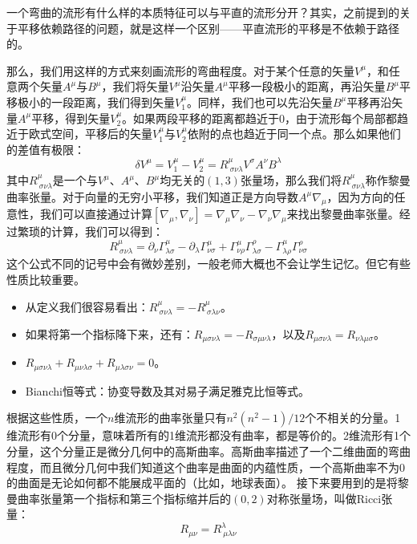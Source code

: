 \documentclass{ctexart}
\begin{document}
一个弯曲的流形有什么样的本质特征可以与平直的流形分开？其实，之前提到的关于平移依赖路径的问题，就是这样一个区别——平直流形的平移是不依赖于路径的。

那么，我们用这样的方式来刻画流形的弯曲程度。对于某个任意的矢量$V^\mu$，和任意两个矢量$A^\mu$与$B^\mu$，我们将矢量$V^\mu$沿矢量$A^\mu$平移一段极小的距离，再沿矢量$B^\mu$平移极小的一段距离，我们得到矢量$V_1^\mu$。同样，我们也可以先沿矢量$B^\mu$平移再沿矢量$A^\mu$平移，得到矢量$V_2^\mu$。如果两段平移的距离都趋近于0，由于流形每个局部都趋近于欧式空间，平移后的矢量$V_1^\mu$与$V_2^\mu$依附的点也趋近于同一个点。那么如果他们的差值有极限：
\begin{equation}
\delta V^\mu=V_1^\mu-V_2^\mu=R_{\ \sigma\nu\lambda}^{\mu}V^\sigma A^\nu B^\lambda
\end{equation}
其中$R_{\ \sigma\nu\lambda}^{\mu}$是一个与$V^\mu$、$A^\mu$、$B^\mu$均无关的$(1,3)$张量场，那么我们将$R_{\ \sigma\nu\lambda}^{\mu}$称作黎曼曲率张量。对于向量的无穷小平移，我们知道正是方向导数$A^\mu\nabla_\mu$，因为方向的任意性，我们可以直接通过计算$[\nabla_\mu,\nabla_\nu]=\nabla_\mu\nabla_\nu-\nabla_\nu\nabla_\mu$来找出黎曼曲率张量。经过繁琐的计算，我们可以得到：
\begin{equation}
R^\mu_{\ \sigma\nu\lambda}=\partial_\nu\Gamma^\mu_{\lambda\sigma}-\partial_\lambda\Gamma^\mu_{\nu\sigma}+\Gamma^\mu_{\nu\rho}\Gamma^\rho_{\lambda\sigma}-\Gamma^\mu_{\lambda\rho}\Gamma^\rho_{\nu\sigma}
\end{equation}
这个公式不同的记号中会有微妙差别，一般老师大概也不会让学生记忆。但它有些性质比较重要。
\begin{itemize}
\item 从定义我们很容易看出：$R^\mu_{\ \sigma\nu\lambda}=-R^\mu_{\ \sigma\lambda\nu}$。
\item 如果将第一个指标降下来，还有：$R_{\mu\sigma\nu\lambda}=-R_{\sigma\mu\nu\lambda}，以及R_{\mu\sigma\nu\lambda}=R_{\nu\lambda\mu\sigma}$。
\item $R_{\mu\sigma\nu\lambda}+R_{\mu\nu\lambda\sigma}+R_{\mu\lambda\sigma\nu}=0$。
\item Bianchi恒等式：协变导数及其对易子满足雅克比恒等式。
\end{itemize}

根据这些性质，一个$n$维流形的曲率张量只有$n^2(n^2-1)/12$个不相关的分量。1维流形有0个分量，意味着所有的1维流形都没有曲率，都是等价的。2维流形有1个分量，这个分量正是微分几何中的高斯曲率。高斯曲率描述了一个二维曲面的弯曲程度，而且微分几何中我们知道这个曲率是曲面的内蕴性质，一个高斯曲率不为0的曲面是无论如何都不能展成平面的（比如，地球表面）。
接下来要用到的是将黎曼曲率张量第一个指标和第三个指标缩并后的$(0,2)$对称张量场，叫做Ricci张量：
\begin{equation}
R_{\mu\nu}=R^\lambda_{\ \mu\lambda\nu}
\end{equation}
\end{document}
